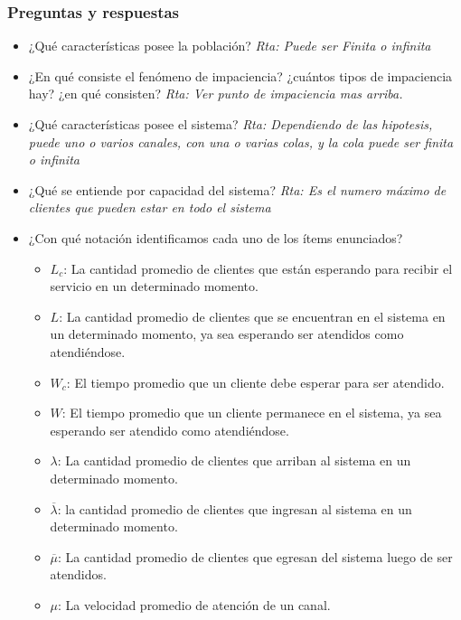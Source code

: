 \documentclass{article}
\begin{document}
\newpage
\subsubsection{Preguntas y respuestas}
\begin{itemize}
    \item ¿Qué características posee la población?
        \newline\textit{Rta: Puede ser Finita o infinita}
    \item ¿En qué consiste el fenómeno de impaciencia? ¿cuántos tipos de impaciencia hay? ¿en qué consisten?
        \newline\textit{Rta: Ver punto de impaciencia mas arriba.}
    \item ¿Qué características posee el sistema?
        \newline\textit{Rta: Dependiendo de las hipotesis, puede uno o varios canales, con una o varias colas, y la cola puede ser finita o infinita}
    \item ¿Qué se entiende por capacidad del sistema?
        \newline\textit{Rta: Es el numero máximo de clientes que pueden estar en todo el sistema}
    \item ¿Con qué notación identificamos cada uno de los ítems enunciados?
        \begin{itemize}
            \item \(L_c\): La cantidad promedio de clientes que están esperando para recibir el servicio en un determinado momento.
            \item \(L\): La cantidad promedio de clientes que se encuentran en el sistema en un determinado momento, ya sea esperando ser atendidos como atendiéndose.
            \item \(W_c\): El tiempo promedio que un cliente debe esperar para ser atendido.
            \item \(W\): El tiempo promedio que un cliente permanece en el sistema, ya sea esperando ser atendido como atendiéndose.
            \item \(\lambda\): La cantidad promedio de clientes que arriban al sistema en un determinado momento.
            \item $\overline{\lambda}$: la cantidad promedio de clientes que ingresan al sistema en un determinado momento.
            \item $\overline{\mu}$: La cantidad promedio de clientes que egresan del sistema luego de ser atendidos.
            \item \(\mu\): La velocidad promedio de atención de un canal.

\end{itemize}
\end{itemize}
\end{document}
